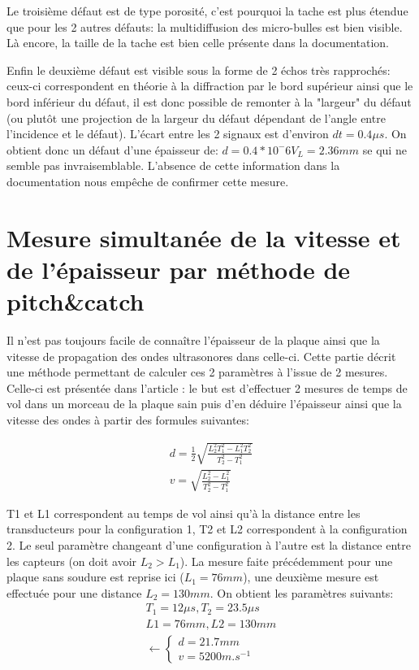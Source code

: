 \documentclass[twoside]{article}
\begin{document}
\begin{multicols}{2}
Le troisième défaut est de type porosité, c'est pourquoi la tache est plus étendue que pour les 2 autres défauts: la multidiffusion des micro-bulles est bien visible. Là encore, la taille de la tache est bien celle présente dans la documentation.

 Enfin le deuxième défaut est visible sous la forme de 2 échos très rapprochés: ceux-ci correspondent en théorie à la diffraction par le bord supérieur ainsi que le bord inférieur du défaut, il est donc possible de remonter à la "largeur" du défaut (ou plutôt une projection de la largeur du défaut dépendant de l'angle entre l'incidence et le défaut). L'écart entre les 2 signaux est d'environ $dt = 0.4 \mu s$. On obtient donc un défaut d'une épaisseur de: $d = 0.4 *10^-6 V_L = 2.36 mm$ se qui ne semble pas invraisemblable. L'absence de cette information dans la documentation nous empêche de confirmer cette mesure.

\section{Mesure simultanée de la vitesse et de l'épaisseur par méthode de pitch\&catch}
Il n'est pas toujours facile de connaître l'épaisseur de la plaque ainsi que la vitesse de propagation des ondes ultrasonores dans celle-ci. Cette partie décrit une méthode
permettant de calculer ces 2 paramètres à l'issue de 2 mesures. Celle-ci est présentée dans l'article \cite{article1}: le but est d'effectuer 2 mesures de temps de vol dans un morceau de la plaque sain puis d'en déduire l'épaisseur ainsi que la vitesse des ondes à partir des formules suivantes:

\begin{eqnarray}
d = \frac{1}{2} \sqrt{ \frac{L_2^2 T_1^2 - L_1^2 T_2^2}{T_2^2	- T_1^2}} \\
v = \sqrt{\frac{L_2^2 - L_1^2}{T_2^2 - T_1^2}}
\end{eqnarray}

T1 et L1 correspondent au temps de vol ainsi qu'à la distance entre les transducteurs pour la configuration 1, T2 et L2 correspondent à la configuration 2. Le seul paramètre changeant d'une configuration à l'autre est la distance entre les capteurs (on doit avoir $L_2 > L_1$). La mesure faite précédemment pour une plaque sans soudure est reprise ici ($L_1 = 76mm$), une deuxième mesure est effectuée pour une distance $L_2 = 130 mm$. On obtient les paramètres suivants:
\begin{eqnarray}
T_1 = 12 \mu s , T_2 = 23.5 \mu s \\
L1 = 76mm , L2 = 130 mm \\
\leftarrow \left\{\begin{matrix}
d = 21.7 mm\\
 v= 5200m.s^{-1}
\end{matrix}\right. 
\end{eqnarray}


\end{multicols}
\end{document}
